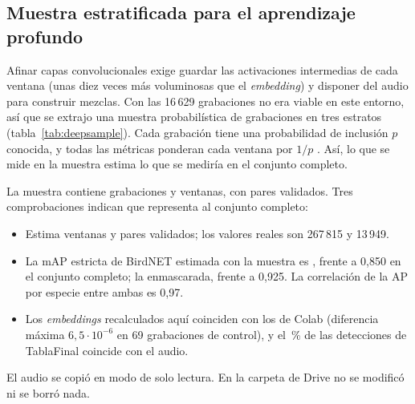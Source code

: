 \subsection{Muestra estratificada para el aprendizaje profundo}\label{sec:muestra}
Afinar capas convolucionales exige guardar las activaciones intermedias de cada ventana (unas diez veces más voluminosas que el
\emph{embedding}) y disponer del audio para construir mezclas. Con las 16\,629 grabaciones no era viable en este entorno, así que se extrajo
una muestra probabilística de grabaciones en tres estratos (tabla~\ref{tab:deepsample}). Cada grabación tiene una probabilidad de inclusión
$p$ conocida, y todas las métricas ponderan cada ventana por $1/p$ \citep{horvitz1952sampling}. Así, lo que se mide en la muestra estima lo
que se mediría en el conjunto completo.

\begin{table}[H]
  \centering\small
  \caption{Diseño de la muestra de grabaciones. El estrato A conserva todos los rechazos y todos los positivos de las especies escasas.}\label{tab:deepsample}
\end{table}

La muestra contiene \deepRecordings{} grabaciones y \deepWindows{} ventanas, con \deepPositives{} pares validados. Tres comprobaciones
indican que representa al conjunto completo:
\begin{itemize}
  \item Estima \deepUniverseWindows{} ventanas y \deepUniversePositives{} pares validados; los valores reales son 267\,815 y 13\,949.
  \item La mAP estricta de BirdNET estimada con la muestra es \deepStrictBirdnet{}, frente a 0,850 en el conjunto completo; la enmascarada,
        \deepMaskedBirdnet{} frente a 0,925. La correlación de la AP por especie entre ambas es 0,97.
  \item Los \emph{embeddings} recalculados aquí coinciden con los de Colab (diferencia máxima $6{,}5\cdot 10^{-6}$ en 69 grabaciones de control),
        y el \deepQc\,\% de las detecciones de TablaFinal coincide con el audio.
\end{itemize}
El audio se copió en modo de solo lectura. En la carpeta de Drive no se modificó ni se borró nada.

